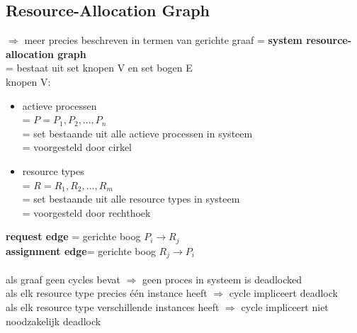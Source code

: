 \documentclass{report}
\begin{document}
\subsection{Resource-Allocation Graph}
$\Rightarrow$ meer precies beschreven in termen van gerichte graaf = \textbf{system resource-allocation graph}
\\= bestaat uit set knopen V en set bogen E
\\knopen V:
\begin{itemize}
\item actieve processen
\\= $P = {P_{1},P_{2},...,P_{n}}$
\\= set bestaande uit alle actieve processen in systeem
\\= voorgesteld door cirkel
\item resource types
\\= $R = {R_{1},R_{2},...,R_{m}}$
\\= set bestaande uit alle resource types in systeem
\\= voorgesteld door rechthoek

\end{itemize}
\textbf{request edge} = gerichte boog $P_{i} \rightarrow R_{j}$
\\\textbf{assignment edge}= gerichte boog $R_{j} \rightarrow P_{i}$
\\
\\als graaf geen cycles bevat $\Rightarrow$ geen proces in systeem is deadlocked
\\als elk resource type precies \'e\'en instance heeft $\Rightarrow$ cycle impliceert deadlock
\\als elk resource type verschillende instances heeft $\Rightarrow$ cycle impliceert niet noodzakelijk deadlock
\end{document}
